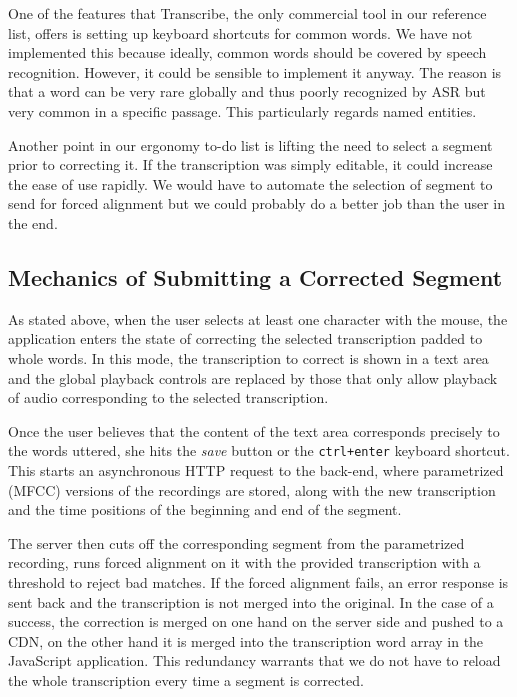 \documentclass{svproc}
\begin{document}
One of the features that Transcribe, the only commercial tool in our reference
list, offers is setting up keyboard shortcuts for common words. We have not
implemented this because ideally, common words should be covered by speech
recognition. However, it could be sensible to implement it anyway. The reason is
that a word can be very rare globally and thus poorly recognized by ASR but very
common in a specific passage. This particularly regards named entities.

Another point in our ergonomy to-do list is lifting the need to select a segment
prior to correcting it. If the transcription was simply editable, it could
increase the ease of use rapidly. We would have to automate the selection of
segment to send for forced alignment but we could probably do a better job than
the user in the end.

\subsection{Mechanics of Submitting a Corrected Segment}

As stated above, when the user selects at least one character with the mouse,
the application enters the state of correcting the selected transcription padded
to whole words. In this mode, the transcription to correct is shown in a
text area and the global playback controls are replaced by those that only allow
playback of audio corresponding to the selected transcription.

Once the user believes that the content of the text area corresponds precisely
to the words uttered, she hits the {\em save} button or the \texttt{ctrl+enter}
keyboard shortcut. This starts an asynchronous HTTP request to the back-end,
where parametrized (MFCC) versions of the recordings are stored, along with the
new transcription and the time positions of the beginning and end of the
segment.

The server then cuts off the corresponding segment from the parametrized
recording, runs forced alignment on it with the provided transcription with a
threshold to reject bad matches. If the forced alignment fails, an error
response is sent back and the transcription is not merged into the original. In
the case of a success, the correction is merged on one hand on the server side
and pushed to a CDN, on the other hand it is merged into the transcription word
array in the JavaScript application. This redundancy warrants that we do not
have to reload the whole transcription every time a segment is corrected.
\end{document}
